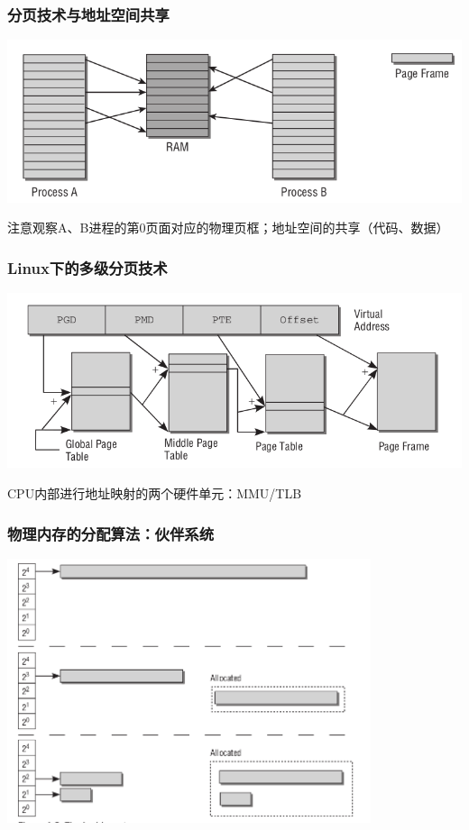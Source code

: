 \documentclass[xcolor=svgnames]{beamer}
\begin{document}
\begin{CJK*}{UTF8}{gbsn}
\begin{frame}[fragile]%
\frametitle{分页技术与地址空间共享}
\includegraphics[width=1.0\textwidth]{paging.png}

注意观察A、B进程的第0页面对应的物理页框；地址空间的共享（代码、数据）
\end{frame}

\begin{frame}[fragile]%
\frametitle{Linux下的多级分页技术}
\includegraphics[width=1.0\textwidth]{pagetables.png}

CPU内部进行地址映射的两个硬件单元：MMU/TLB
\end{frame}

\begin{frame}[fragile]%
\frametitle{物理内存的分配算法：伙伴系统}
\includegraphics[width=0.8\textwidth]{buddy.png}


\end{frame}
\end{CJK*}
\end{document}
